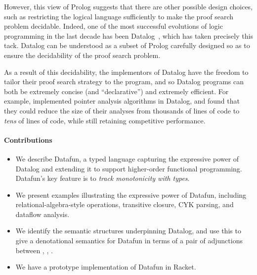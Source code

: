 However, this view of Prolog suggests that there are other possible
design choices, such as restricting the logical language sufficiently
to make the proof search problem decidable. Indeed, one of the most
successful evolutions of logic programming in the last decade has been
Datalog~\cite{datalog}, which has taken precisely this tack. Datalog
can be understood as a subset of Prolog carefully designed so as to
ensure the decidability of the proof search problem.



As a result of this decidability, the implementors of Datalog have the
freedom to tailor their proof search strategy to the program, and so
Datalog programs can both be extremely concise (and ``declarative'')
and extremely efficient. For example, \citet{whaley-lam} implemented
pointer analysis algorithms in Datalog, and found that they could
reduce the size of their analyses from thousands of lines of code to
\emph{tens} of lines of code, while still retaining competitive
performance.













\paragraph{Contributions}
\begin{itemize}
\item We describe Datafun, a typed language capturing the expressive power of
  Datalog and extending it to support higher-order functional programming.
  Datafun's key feature is to \emph{track monotonicity with types}.

\item We present examples illustrating the expressive power of Datafun,
  including relational-algebra-style operations, transitive closure, CYK
  parsing, and dataflow analysis.

\item We identify the semantic structures underpinning Datalog, and use this to
  give a denotational semantics for Datafun in terms of a pair of adjunctions
  between \cSet{}, \cPoset{}, \cSL{}.

\item We have a prototype implementation of Datafun in Racket. 
\end{itemize}

